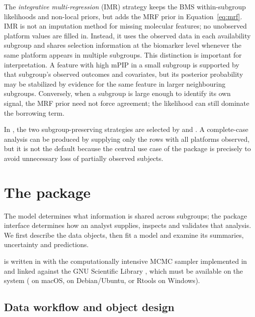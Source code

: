 \documentclass[article]{jss}
\begin{document}
The \emph{integrative multi-regression} (IMR) strategy keeps the BMS
within-subgroup likelihoods and non-local priors, but adds the MRF prior in
Equation~\ref{eq:mrf}.  IMR is not an imputation method for missing molecular
features; no unobserved platform values are filled in.  Instead, it uses the
observed data in each availability subgroup and shares selection information at
the biomarker level whenever the same platform appears in multiple subgroups.
This distinction is important for interpretation.  A feature with high mPIP in
a small subgroup is supported by that subgroup's observed outcomes and
covariates, but its posterior probability may be stabilized by evidence for the
same feature in larger neighbouring subgroups.  Conversely, when a subgroup is
large enough to identify its own signal, the MRF prior need not force agreement;
the likelihood can still dominate the borrowing term.

In , the two subgroup-preserving strategies are selected by
 and .  A complete-case analysis can
be produced by supplying only the rows with all platforms observed, but it is
not the default because the central use case of the package is precisely to
avoid unnecessary loss of partially observed subjects.

\section[The package IntegMultiReg]{The package }\label{sec:package}

The model determines what information is shared across subgroups; the package
interface determines how an analyst supplies, inspects and validates that
analysis. We first describe the data objects, then fit a model and examine
its summaries, uncertainty and predictions.

 is written in  \citep{rcore} with the
computationally intensive MCMC sampler implemented in  and linked
against the GNU Scientific Library \citep[GSL,][]{galassi2009}, which must be
available on the system ( on macOS,
 on Debian/Ubuntu, or Rtools on Windows).

\subsection{Data workflow and object design}\label{sec:workflow}
\end{document}
